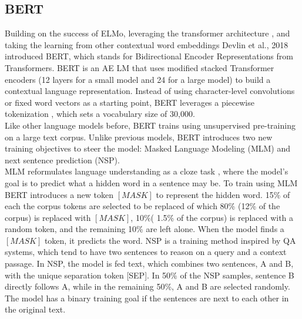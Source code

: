 \subsection{BERT}
Building on the success of ELMo, leveraging the transformer architecture \cite{Vaswani2017AttentionIA}, and taking the learning from other contextual word embeddings \cite{Howard2018UniversalLM} \cite{Radford2018ImprovingLU} Devlin et al., 2018 introduced BERT, which stands for Bidirectional Encoder Representations from Transformers. BERT is an AE LM that uses modified stacked Transformer encoders (12 layers for a small model and 24 for a large model) to build a contextual language representation. Instead of using character-level convolutions or fixed word vectors as a starting point, BERT leverages a piecewise tokenization \cite{Wu2016GooglesNM}, which sets a vocabulary size of 30,000.  \\
Like other language models before, BERT trains using unsupervised pre-training on a large text corpus. Unlike previous models, BERT introduces two new training objectives to steer the model: Masked Language Modeling (MLM) and next sentence prediction (NSP). \\
MLM reformulates language understanding as a cloze task \cite{Taylor1953ClozePA}, where the model's goal is to predict what a hidden word in a sentence may be. To train using MLM BERT introduces a new token $[MASK]$ to represent the hidden word. 15\% of each the corpus tokens are selected to be replaced of which 80\% (12\% of the corpus) is replaced with $[MASK]$, 10\%( 1.5\% of the corpus) is replaced with a random token, and the remaining 10\% are left alone. When the model finds a $[MASK]$ token, it predicts the word. NSP is a training method inspired by QA systems, which tend to have two sentences to reason on a query and a context passage. In NSP, the model is fed text, which combines two sentences, A and B, with the unique separation token [SEP]. In 50\% of the NSP samples, sentence B directly follows A, while in the remaining 50\%, A and B are selected randomly. The model has a binary training goal if the sentences are next to each other in the original text.\\
